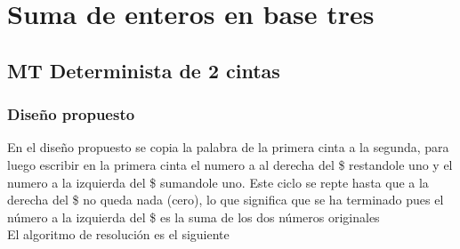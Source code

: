 \section{Suma de enteros en base tres}


\subsection{MT Determinista de 2 cintas}

\subsubsection*{Diseño propuesto}

En el diseño propuesto se copia la palabra de la primera cinta a la segunda, para luego escribir en la primera cinta el numero a al derecha del \$ restandole uno y el numero a la izquierda del \$ sumandole uno. Este ciclo se repte hasta que a la derecha del \$ no queda nada (cero), lo que significa que se ha terminado pues el número a la izquierda del \$ es la suma de los dos números originales \\

El algoritmo de resolución es el siguiente

